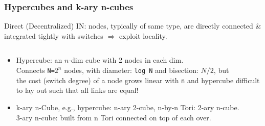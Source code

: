 \documentclass{beamer}
\renewcommand{\emph}[1]{\textcolor{structure}{#1}}
\newcommand{\emp}[1]{\textcolor{DikuRed}{ #1}}
\begin{document}
\begin{frame}[fragile,t]
\frametitle{Hypercubes and k-ary n-cubes}

\emp{Direct (Decentralized) IN}: nodes, typically of same type, are directly 
connected \& integrated tightly with switches $\Rightarrow$ \emph{exploit locality}.

\begin{columns}
\pause

\begin{scriptsize}
\begin{itemize}
    \item \emp{Hypercube}: an $n$-dim cube with 2 nodes in each dim.\\
                           Connects \emph{\tt N=$2^n$} nodes, with
          \emph{diameter: {\tt log N} and bisection: $N/2$}, \alert{but}\\
            \alert{the cost (switch degree) of a node grows linear with {\tt n} and 
            hypercube difficult to lay out such that all links are equal!}\bigskip

    \item \emp{k-ary n-Cube}, e.g., hypercube: n-ary 2-cube, n-by-n Tori: 2-ary n-cube.\\  
           3-ary n-cube: built from n Tori connected on top of each over.\bigskip
    
\end  {itemize}
\end{scriptsize}
\end{columns}

\end{frame}
\end{document}
